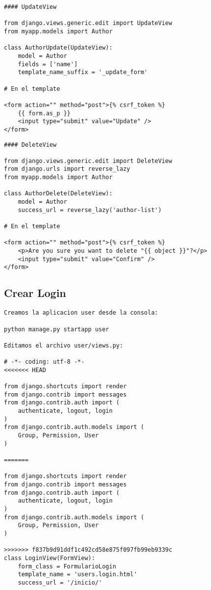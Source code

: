 \documentclass[xcolor=dvipsnames]{beamer}
\begin{document}
\begin{frame}[fragile]
\begin{verbatim}
#### UpdateView

from django.views.generic.edit import UpdateView
from myapp.models import Author

class AuthorUpdate(UpdateView):
    model = Author
    fields = ['name']
    template_name_suffix = '_update_form'
    
# En el template

<form action="" method="post">{% csrf_token %}
    {{ form.as_p }}
    <input type="submit" value="Update" />
</form>

\end{verbatim}
\end{frame}

\begin{frame}[fragile]
\begin{verbatim}
#### DeleteView

from django.views.generic.edit import DeleteView
from django.urls import reverse_lazy
from myapp.models import Author

class AuthorDelete(DeleteView):
    model = Author
    success_url = reverse_lazy('author-list')
    
# En el template

<form action="" method="post">{% csrf_token %}
    <p>Are you sure you want to delete "{{ object }}"?</p>
    <input type="submit" value="Confirm" />
</form>

\end{verbatim}
\end{frame}

\subsection{Crear Login}
\begin{frame}[fragile]
\begin{verbatim}
Creamos la aplicacion user desde la consola:

python manage.py startapp user

Editamos el archivo user/views.py:

# -*- coding: utf-8 -*-
<<<<<<< HEAD

from django.shortcuts import render
from django.contrib import messages
from django.contrib.auth import (
    authenticate, logout, login
)
from django.contrib.auth.models import (
    Group, Permission, User
)

=======

from django.shortcuts import render
from django.contrib import messages
from django.contrib.auth import (
    authenticate, logout, login
)
from django.contrib.auth.models import (
    Group, Permission, User
)

>>>>>>> f837b9d91ddf1c492cd58e875f097fb99eb9339c
class LoginView(FormView):
    form_class = FormularioLogin
    template_name = 'users.login.html'
    success_url = '/inicio/'
\end{verbatim}
\end{frame}
\end{document}
